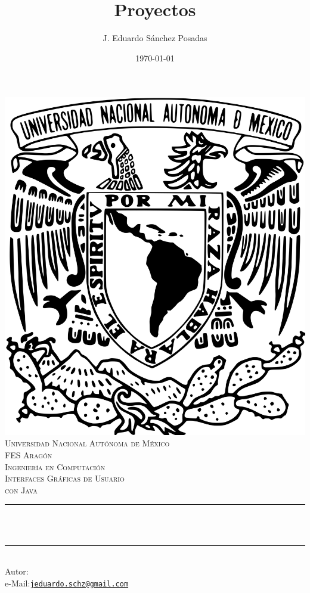 \documentclass[11pt,a4paper]{article}
\title{Proyectos}						%
\author{J. Eduardo Sánchez Posadas}					%
\date{\today}											%
\makeatletter
\let\thetitle\@title
\let\theauthor\@author
\let\thedate\@date
\makeatother
\begin{document}

\begin{titlepage}
	\centering
    \vspace*{0.5 cm}
\includegraphics[scale=0.05]{pics/escudo.png} \\[1.0 cm]  %
\textsc{\Large Universidad Nacional Autónoma de México}\\[2.0 cm] %
\textsc{\Large FES Aragón\\ Ingeniería en Computación}\\[0.5 cm] %
\textsc{\large Interfaces Gráficas de Usuario \\ con Java}\\[0.5cm] %

	\rule{\linewidth}{0.2 mm} \\[0.4 cm]
	{ \huge \bfseries \thetitle}\\
	\rule{\linewidth}{0.2 mm} \\[1.5 cm]
	 			{Autor: \large \theauthor}\\
	 			{e-Mail:\href{mailto:jeduardo.schz@gmail.com}{\texttt{jeduardo.schz@gmail.com}}}\\[0.5cm]
	{\large \thedate}\\[2 cm]
 
	\vfill
	
\end{titlepage}
\end{document}
